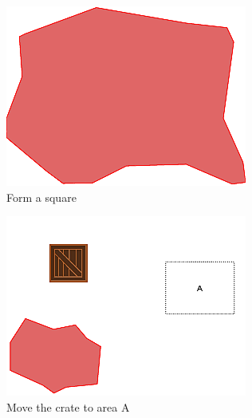 \documentclass[]{article}
\begin{document}
\begin{figure}
\begin{subfigure}{0.42\textwidth}
		\centering
		\includegraphics[width=\linewidth]{slide_images/Swarm_Robot_Control_-_Unknown_Number_of_Robots_0025.png}
		\caption{Form a square}
		\label{fig:sub1}
	\end{subfigure}%
	\begin{subfigure}{0.42\textwidth}
		\centering
		\includegraphics[width=\linewidth]{slide_images/Swarm_Robot_Control_-_Unknown_Number_of_Robots_0027.png}
		\caption{Move the crate to area A}
		\label{fig:sub1}
	\end{subfigure}
	\begin{subfigure}{0.42\textwidth}
		\centering

\end{subfigure}
\end{figure}
\end{document}
